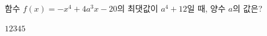 함수 $f(x)=-x^4+4a^3x-20$의 최댓값이 $a^4+12$일 때, 양수 $a$의 값은?
\begin{choices32}{$1$}{$2$}{$3$}{$4$}{$5$}\end{choices32}
